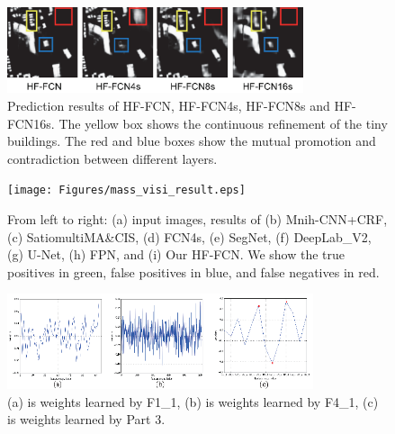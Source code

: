\begin{figure}
\vspace{-0cm}
\setlength{\abovecaptionskip}{-0cm}
\setlength{\belowcaptionskip}{-1cm}
\centering
\includegraphics[width=8.7cm]{Figures/HF-FCN_variants_result.eps}
\caption{Prediction results of HF-FCN, HF-FCN4s, HF-FCN8s and HF-FCN16s. The yellow box shows the continuous refinement of the tiny buildings. The red and blue boxes show the mutual promotion and contradiction between different layers.}
\label{fig:Mass-variants-visi}
\end{figure}

\begin{figure}
\vspace{-0.5cm}
\setlength{\abovecaptionskip}{-0cm}
\setlength{\belowcaptionskip}{-1cm}
\centering
\texttt{[image: Figures/mass\_visi\_result.eps]}
\caption{From left to right: (a) input images, results of (b) Mnih-CNN+CRF, (c) Satio\-multi\-MA\&CIS, (d) FCN4s, (e) SegNet, (f) DeepLab\_V2, (g) U-Net, (h) FPN, and (i) Our HF-FCN. We show the true positives in green, false positives in blue, and false negatives in red.}
\label{fig:Mass-visi-result}
\end{figure}

\begin{figure}
\vspace{-0.4cm}
\setlength{\abovecaptionskip}{-0cm}
\setlength{\belowcaptionskip}{-1cm}
\centering
\includegraphics[width=9cm]{Figures/weights.eps}
\caption{(a) is weights learned by F1\_1, (b) is weights learned by F4\_1, (c) is weights learned by Part 3.}
\label{fig:Mass-weights}
\end{figure}

